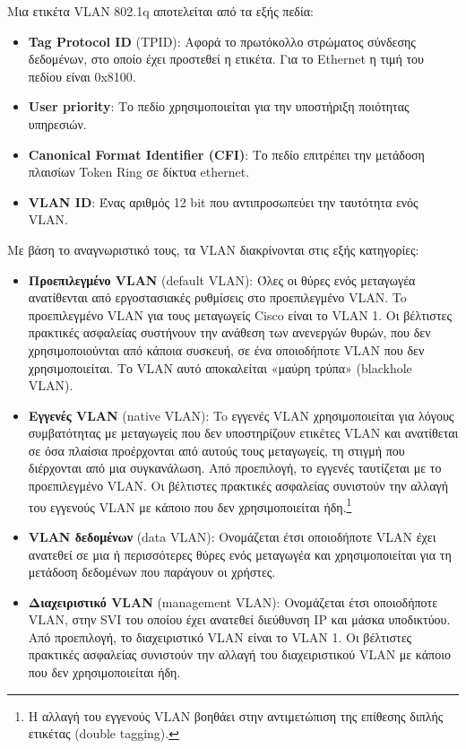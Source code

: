 \documentclass{EdipyLabs} %
\begin{document}
Μια ετικέτα VLAN 802.1q αποτελείται από τα εξής πεδία:
\begin{itemize}
	\item \textbf{Tag Protocol ID} (TPID): Αφορά το πρωτόκολλο στρώματος σύνδεσης δεδομένων, στο οποίο έχει προστεθεί η ετικέτα. Για το Ethernet η τιμή του πεδίου είναι 0x8100.
	\item \textbf{User priority}: Το πεδίο χρησιμοποιείται για την υποστήριξη ποιότητας υπηρεσιών.
	\item \textbf{Canonical Format Identifier (CFI)}: Το πεδίο επιτρέπει την μετάδοση πλαισίων Token Ring σε δίκτυα ethernet.
	\item \textbf{VLAN ID}: Ένας αριθμός 12 bit που αντιπροσωπεύει την ταυτότητα ενός VLAN.
\end{itemize}

Με βάση το αναγνωριστικό τους, τα VLAN διακρίνονται στις εξής κατηγορίες:
\begin{itemize}
	\item \textbf{Προεπιλεγμένο VLAN} (default VLAN): Όλες οι θύρες ενός μεταγωγέα ανατίθενται από εργοστασιακές ρυθμίσεις στο προεπιλεγμένο VLAN. To προεπιλεγμένο VLAN για τους μεταγωγείς Cisco είναι το VLAN 1. Οι βέλτιστες πρακτικές ασφαλείας συστήνουν την ανάθεση των ανενεργών θυρών, που δεν χρησιμοποιούνται από κάποια συσκευή, σε ένα οποιοδήποτε VLAN που δεν χρησιμοποιείται. Το VLAN αυτό αποκαλείται «μαύρη τρύπα» (blackhole VLAN).
	\item \textbf{Εγγενές VLAN} (native VLAN): To εγγενές VLAN χρησιμοποιείται για λόγους συμβατότητας με μεταγωγείς που δεν υποστηρίζουν ετικέτες VLAN και ανατίθεται σε όσα πλαίσια προέρχονται από αυτούς τους μεταγωγείς, τη στιγμή που διέρχονται από μια συγκανάλωση. Από προεπιλογή, το εγγενές ταυτίζεται με το προεπιλεγμένο VLAN. Οι βέλτιστες πρακτικές ασφαλείας συνιστούν την αλλαγή του εγγενούς VLAN με κάποιο που δεν χρησιμοποιείται ήδη.\footnote{H αλλαγή του εγγενούς VLAN βοηθάει στην αντιμετώπιση της επίθεσης διπλής ετικέτας (double tagging).}
	\item \textbf{VLAN δεδομένων} (data VLAN): Ονομάζεται έτσι οποιοδήποτε VLAN έχει ανατεθεί σε μια ή περισσότερες θύρες ενός μεταγωγέα και χρησιμοποιείται για τη μετάδοση δεδομένων που παράγουν οι χρήστες.
	\item \textbf{Διαχειριστικό VLAN} (management VLAN): Ονομάζεται έτσι οποιοδήποτε VLAN, στην SVI του οποίου έχει ανατεθεί διεύθυνση IP και μάσκα υποδικτύου. Από προεπιλογή, το διαχειριστικό VLAN είναι το VLAN 1. Οι βέλτιστες πρακτικές ασφαλείας συνιστούν την αλλαγή του διαχειριστικού VLAN με κάποιο που δεν χρησιμοποιείται ήδη.
\end{itemize}
\end{document}

